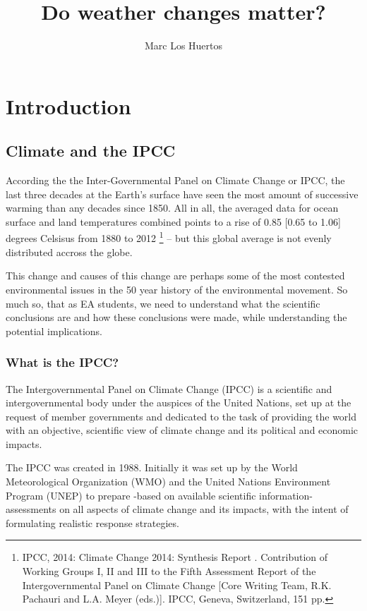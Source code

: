 \documentclass{article}\usepackage[]{graphicx}\usepackage[]{color}
\title{Do weather changes matter?}
\author{Marc Los Huertos}
\begin{document}
\maketitle
\tableofcontents

\section{Introduction}

\subsection{Climate and the IPCC}

According the the Inter-Governmental Panel on Climate Change or IPCC, the last three decades at the Earth's surface have seen the most amount of successive warming than any decades since 1850. All in all, the averaged data for ocean surface and land temperatures combined points to a rise of 0.85 [0.65 to 1.06] degrees Celsisus  from 1880 to 2012 \footnote{IPCC,  2014: Climate  Change  2014:  Synthesis  Report
. Contribution  of  Working  Groups  I,  II  and  III  to  the  Fifth  Assessment  Report  of  the Intergovernmental Panel on Climate Change [Core Writing Team, R.K. Pachauri and L.A. Meyer (eds.)]. IPCC, Geneva, Switzerland, 151 pp.} -- but this global average is not evenly distributed accross the globe. 

This change and causes of this change are perhaps some of the most contested environmental issues in the 50 year history of the environmental movement. So much so, that as EA students, we need to understand what the scientific conclusions are and how these conclusions were made, while understanding the potential implications.

\subsubsection{What is the IPCC?}

The Intergovernmental Panel on Climate Change (IPCC) is a scientific and intergovernmental body under the auspices of the United Nations, set up at the request of member governments and dedicated to the task of providing the world with an objective, scientific view of climate change and its political and economic impacts.

The IPCC was created in 1988. Initially it was set up by the World Meteorological Organization (WMO) and the United Nations Environment Program (UNEP) to prepare -based on available scientific information-  assessments on all aspects of climate change and its impacts, with the intent of formulating realistic response strategies. 
\end{document}
